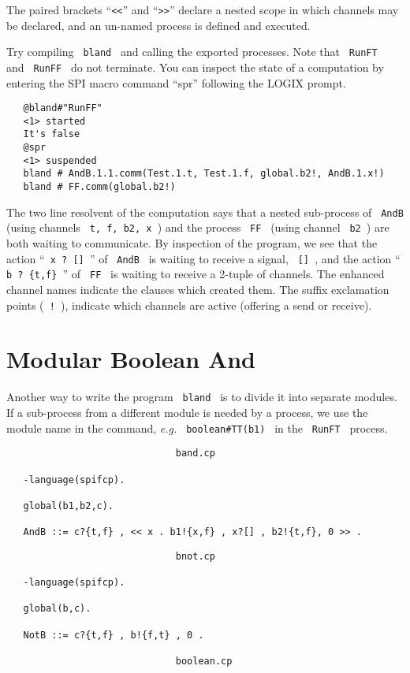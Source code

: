 \noindent
The paired brackets ``\verb+<<+'' and ``\verb+>>+'' declare
a nested scope in which channels may be declared, and an
un-named process is defined and executed.

\noindent
Try compiling \verb+ bland + and calling the exported processes.
Note that \verb+ RunFT + and \verb+ RunFF + do not terminate.  You
can inspect the state of a computation by entering the SPI macro command
``spr'' following the LOGIX prompt.

\begin{verbatim}
   @bland#"RunFF"
   <1> started
   It's false
   @spr
   <1> suspended
   bland # AndB.1.1.comm(Test.1.t, Test.1.f, global.b2!, AndB.1.x!)
   bland # FF.comm(global.b2!)
\end{verbatim}

\noindent
The two line resolvent of the computation says that a nested sub-process of
\verb+ AndB + (using channels \verb+ t, f, b2, x +) and the process
\verb+ FF + (using channel \verb+ b2 +) are both waiting to communicate.
By inspection of the program, we see that the action ``\verb+ x ? [] +''
of \verb+ AndB + is waiting to receive a signal, \verb+ [] +, and the
action ``\verb+ b ? {t,f} +'' of \verb+ FF + is waiting to receive a
2-tuple of channels.  The enhanced channel names indicate the clauses
which created them.  The suffix exclamation points (\verb+ ! +),
indicate which channels are active (offering a send or receive).

\section{Modular Boolean And}
\label{mbland}
Another way to write the program \verb+ bland + is to divide it
into separate modules. If a sub-process from a different module is
needed by a process, we use the module name in the command, {\em e.g.}
\verb+ boolean#TT(b1) + in the \verb+ RunFT + process.

\begin{verbatim}
                              band.cp

   -language(spifcp).

   global(b1,b2,c).

   AndB ::= c?{t,f} , << x . b1!{x,f} , x?[] , b2!{t,f}, 0 >> .
\end{verbatim}

\begin{verbatim}
                              bnot.cp

   -language(spifcp).

   global(b,c).

   NotB ::= c?{t,f} , b!{f,t} , 0 .

                              boolean.cp
\end{verbatim}

